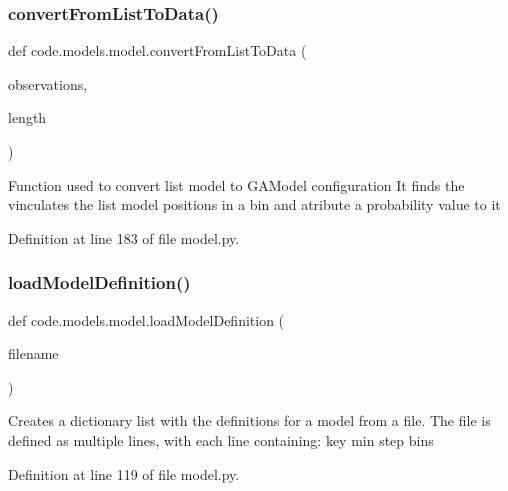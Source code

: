 \subsubsection{\texorpdfstring{convert\+From\+List\+To\+Data()}{convertFromListToData()}}
{\footnotesize\ttfamily def code.\+models.\+model.\+convert\+From\+List\+To\+Data (\begin{DoxyParamCaption}\item[{}]{observations,  }\item[{}]{length }\end{DoxyParamCaption})}

\begin{DoxyVerb}Function used to convert list model to GAModel configuration
It finds the vinculates the list model positions in a bin and atribute a probability value to it
\end{DoxyVerb}
 

Definition at line 183 of file model.\+py.

\mbox{\label{namespacecode_1_1models_1_1model_a516aba6a18e97e9ca010b3b8ce66d033}} 
\subsubsection{\texorpdfstring{load\+Model\+Definition()}{loadModelDefinition()}}
{\footnotesize\ttfamily def code.\+models.\+model.\+load\+Model\+Definition (\begin{DoxyParamCaption}\item[{}]{filename }\end{DoxyParamCaption})}

\begin{DoxyVerb}Creates a dictionary list with the definitions for a model from a file.
The file is defined as multiple lines, with each line containing:
key min step bins
\end{DoxyVerb}
 

Definition at line 119 of file model.\+py.

\mbox{\label{namespacecode_1_1models_1_1model_ad4cd9f5c3ee9cb21283e98f1dcd9d81b}} 
